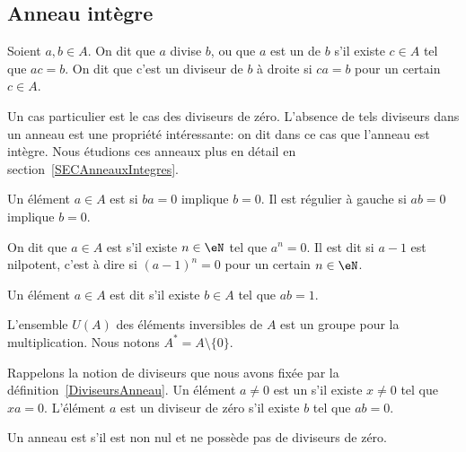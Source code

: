 \subsection{Anneau intègre}

\begin{definition}\label{DiviseursAnneau}
	Soient \( a, b \in A \). On dit que $a$ divise $b$, ou que $a$ est un  de $b$ s'il existe \( c \in A \) tel que \( ac = b \). On dit que c'est un diviseur de $b$ à droite si \( ca = b \) pour un certain \( c \in A \).
\end{definition}
Un cas particulier est le cas des diviseurs de zéro. L'absence de tels diviseurs dans un anneau est une propriété intéressante: on dit dans ce cas que l'anneau est intègre. Nous étudions ces anneaux plus en détail en section~\ref{SECAnneauxIntegres}.

Un élément \( a\in A\) est  si \( ba=0\) implique \( b=0\). Il est régulier à gauche si \( ab=0\) implique \( b=0\).

\begin{definition}
	On dit que \( a \in A \) est  s'il existe \( n \in \eN \) tel que \( a^n = 0 \). Il est dit  si \( a-1\) est nilpotent, c'est à dire si \( (a-1)^n =0\) pour un certain \( n \in \eN \).

	Un élément \( a \in A \) est dit  s'il existe \( b \in A \) tel que \( ab = 1 \).
\end{definition}

L'ensemble \( U(A)\) des éléments inversibles de \( A\) est un groupe pour la multiplication. Nous notons \( A^*=A\setminus\{ 0 \}\).

Rappelons la notion de diviseurs que nous avons fixée par la définition~\ref{DiviseursAnneau}.  Un élément \( a\neq 0\) est un  s'il existe \( x\neq 0\) tel que $xa=0$. L'élément \( a\) est un diviseur de zéro  s'il existe \( b\) tel que \( ab=0\).
\begin{definition}      \label{DEFooTAOPooWDPYmd}
    Un anneau est  s'il est non nul et ne possède pas de diviseurs de zéro.
\end{definition}

